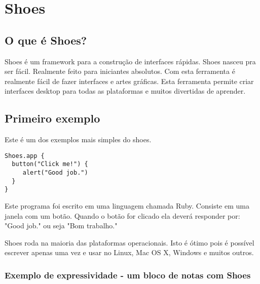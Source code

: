 \documentclass[12pt]{article}
\begin{document}
\section{ Shoes }

\subsection{O que é Shoes?}

Shoes é um framework para a construção de interfaces rápidas. Shoes nasceu pra ser fácil. Realmente feito para iniciantes absolutos. Com esta ferramenta é realmente fácil de fazer interfaces e artes gráficas. 
Esta ferramenta permite criar interfaces desktop para todas as plataformas e muitos divertidas de aprender.

\subsection{ Primeiro exemplo }

Este é um dos exemplos mais simples do shoes. 

\begin{lstlisting}[caption=Primeiro exemplo do framework Shoes  ]
Shoes.app { 
  button("Click me!") {
     alert("Good job.") 
  }
} 
\end{lstlisting}

Este programa foi escrito em uma linguagem chamada Ruby. Consiste em uma janela com um botão. Quando o botão for clicado ela deverá responder por: "Good job." ou seja "Bom trabalho."

Shoes roda na maioria das plataformas operacionais. Isto é ótimo pois é possível escrever apenas uma vez e usar no Linux, Mac OS X, Windows e muitos outros.


\subsubsection{ Exemplo de expressividade - um bloco de notas com Shoes }
\end{document}

